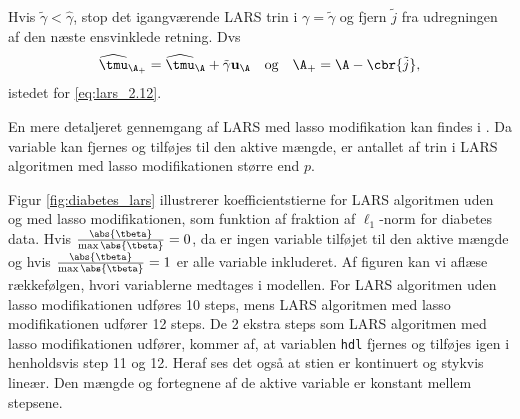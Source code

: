 %
Hvis \(\tilde{\gamma} < \widehat{\gamma}\), stop det igangværende LARS trin i \(\gamma = \tilde{\gamma}\) og fjern \(\tilde{j}\) fra udregningen af den næste ensvinklede retning.
Dvs
\begin{align*}
\widehat{\tmu}_{\A_+} = \widehat{\tmu}_\A + \tilde{\gamma} \mathbf{u}_\A \quad \text{og} \quad \A_+ = \A - \cbr{\tilde{j}},
\end{align*}
istedet for \eqref{eq:lars_2.12}.

En mere detaljeret gennemgang af LARS med lasso modifikation kan findes i \citep{efron}.
Da variable kan fjernes og tilføjes til den aktive mængde, er antallet af trin i LARS algoritmen med lasso modifikationen større end \(p\).

\begin{eks}
Figur \ref{fig:diabetes_lars} illustrerer koefficientstierne for LARS algoritmen uden og med lasso modifikationen, som funktion af fraktion af \(\ell_1\)-norm for diabetes data.
Hvis \(\frac{\abs{\tbeta}}{\max \abs{\tbeta}} = 0\), da er ingen variable tilføjet til den aktive mængde og hvis \(\frac{\abs{\tbeta}}{\max \abs{\tbeta}} = 1\) er alle variable inkluderet.
Af figuren kan vi aflæse rækkefølgen, hvori variablerne medtages i modellen.
For LARS algoritmen uden lasso modifikationen udføres 10 steps, mens LARS algoritmen med lasso modifikationen udfører 12 steps.
De 2 ekstra steps som LARS algoritmen med lasso modifikationen udfører, kommer af, at variablen \texttt{hdl} fjernes og tilføjes igen i henholdsvis step 11 og 12.
Heraf ses det også at stien er kontinuert og stykvis lineær.
Den mængde og fortegnene af de aktive variable er konstant mellem stepsene.

\end{eks}

